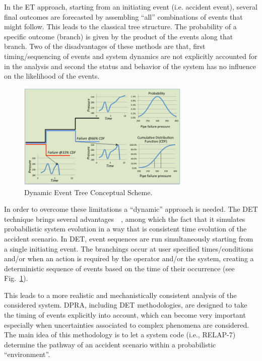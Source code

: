 \label{sec:det}
In the ET approach, starting from an initiating event (i.e. accident event), several final outcomes are forecasted by assembling ``all'' combinations of events that might follow. This leads to the classical tree structure. The probability of a specific outcome (branch) is given by the product of the events along that branch. 
Two of the disadvantages of these methods are that, first timing/sequencing of events and system dynamics are not explicitly accounted for in the analysis and second the status and behavior of the system has no influence on the likelihood of the events.
\begin{figure}[h] 
  \centering
     \includegraphics[width=0.73\textwidth]{figures/DET_schemeFlow.png}
  \caption{Dynamic Event Tree Conceptual Scheme.}
   \label{fig:DET_schemeFlow}
\end{figure}
In order to overcome these limitations a ``dynamic'' approach is needed. The DET technique brings several advantages~\cite{alfonsiPSA}~\cite{ADAPTHakobyan}, among which the fact that it simulates probabilistic system evolution in a way that is consistent time evolution of the accident scenario. In DET,  event sequences are run simultaneously starting from a single initiating event. The branchings occur at user specified times/conditions and/or when an action is required by the operator and/or the system, creating a deterministic sequence of events based on the time of their occurrence (see Fig.~\ref{fig:DET_schemeFlow}). 

This leads to a more realistic and mechanistically consistent analysis of the considered system. DPRA, including  DET methodologies,  are designed to take the timing of events explicitly into account, which can become very important especially when uncertainties associated to complex phenomena are considered. \\
The main idea of this methodology is to let a system code (i.e., RELAP-7) determine the pathway of an accident scenario within a probabilistic ``environment''. 

